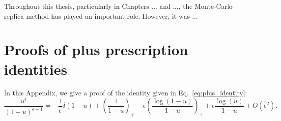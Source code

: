 \documentclass[withindex,glossary]{cam-thesis}
\begin{document}
Throughout this thesis, particularly in Chapters ... and ..., the Monte-Carlo replica method has played an important role. However, it was ...








%

\renewcommand{\bibname}{References}
\cleardoublepage
{}
{}






\appendix

\chapter{Proofs of plus prescription identities}
\label{app:plus_prescription}
In this Appendix, we give a proof of the identity given in Eq.~\eqref{eq:plus_identity}:
\begin{equation}
\label{eq:plus_identity_2}
\frac{u^{\epsilon}}{(1-u)^{\epsilon+1}} = -\frac{1}{\epsilon} \delta(1-u) + \left( \frac{1}{1-u} \right)_+ - \epsilon \left( \frac{\log(1-u)}{1-u} \right)_+ + \epsilon \frac{\log(u)}{1-u} + O(\epsilon^2).
\end{equation}



\printthesisindex
\end{document}
